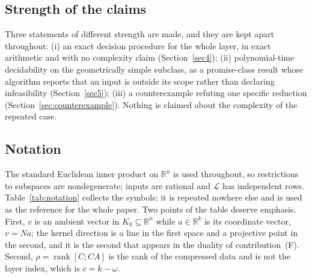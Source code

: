 \documentclass[journal]{IEEEtran}
\theoremstyle{plainn}
\theoremstyle{remark}
\newcommand{\rank}{\operatorname{rank}}
\begin{document}
\subsection{Strength of the claims}\label{sec:intro:claims}

Three statements of different strength are made, and they are kept apart throughout: (i) an exact
decision procedure for the whole layer, in exact arithmetic and with no complexity claim
(Section~\ref{sec4}); (ii) polynomial-time decidability on the geometrically simple subclass, as a
promise-class result whose algorithm reports that an input is outside its scope rather than declaring
infeasibility (Section~\ref{sec5}); (iii) a counterexample refuting one specific reduction
(Section~\ref{sec:counterexample}). Nothing is claimed about the complexity of the repeated case.

\subsection{Notation}\label{sec:intro:notation}

The standard Euclidean inner product on $\mathbb R^n$ is used throughout, so restrictions to subspaces
are nondegenerate; inputs are rational and $\mathcal L$ has independent rows. Table~\ref{tab:notation}
collects the symbols; it is repeated nowhere else and is used as the reference for the whole paper.
Two points of the table deserve emphasis. First, $v$ is an ambient vector in $K_0\subseteq\mathbb R^n$
while $a\in\mathbb R^k$ is its coordinate vector, $v=Na$; the kernel direction is a line in the first
space and a projective point in the second, and it is the second that appears in the duality of
contribution~(F). Second, $\rho=\rank[C;CA]$ is the rank of the compressed data and is not the layer
index, which is $c=k-\omega$.
\end{document}
